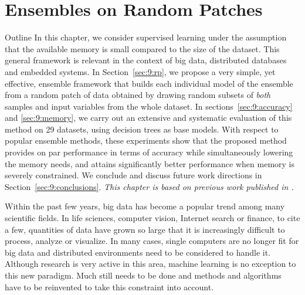 \chapter{Ensembles on Random Patches}\label{ch:random-patches}


\begin{remark}{Outline}
In this chapter, we consider supervised learning under the assumption that the
available memory is small compared to the size of the dataset. This general framework
is relevant in the context of big data, distributed databases and embedded
systems. In Section~\ref{sec:9:rp}, we propose a very simple, yet effective,
ensemble framework that builds each individual model of the ensemble from a
random patch of data obtained by drawing random subsets of \textit{both}
samples and input variables from the whole dataset. In
sections~\ref{sec:9:accuracy} and \ref{sec:9:memory}, we carry out an extensive
and systematic evaluation of this method on 29 datasets, using decision trees
as base models. With respect to popular ensemble methods, these experiments
show that the proposed method provides on par  performance  in terms of
accuracy while simultaneously lowering the memory needs, and attains
significantly better performance when memory is severely constrained. We
conclude and discuss future work directions in Section~\ref{sec:9:conclusions}.
\textit{This chapter is based on previous work published in \citep{louppe:2012}.}
\end{remark}

Within the past few years, big data has become a popular trend among many
scientific fields. In life sciences, computer vision, Internet search or
finance, to cite a few, quantities of data have grown so large that it is
increasingly difficult to process, analyze or visualize. In many cases, single
computers are no longer fit for big data and distributed environments need to
be considered to handle it. Although research is very active in this area,
machine learning is no exception to this new paradigm. Much still needs to be
done and methods and algorithms have to be reinvented to take this constraint
into account.

